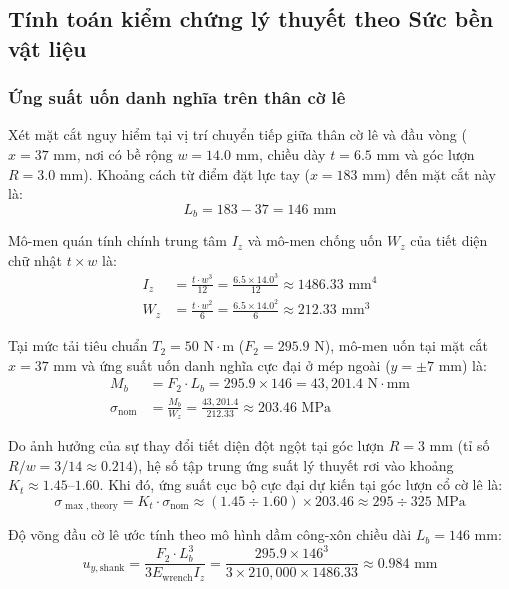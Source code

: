 \documentclass[12pt,a4paper]{article}
\begin{document}
\subsection{Tính toán kiểm chứng lý thuyết theo Sức bền vật liệu}

\subsubsection{Ứng suất uốn danh nghĩa trên thân cờ lê}
Xét mặt cắt nguy hiểm tại vị trí chuyển tiếp giữa thân cờ lê và đầu vòng ($x = 37\text{ mm}$, nơi có bề rộng $w = 14.0\text{ mm}$, chiều dày $t = 6.5\text{ mm}$ và góc lượn $R = 3.0\text{ mm}$). Khoảng cách từ điểm đặt lực tay ($x = 183\text{ mm}$) đến mặt cắt này là:
\begin{equation}
    L_b = 183 - 37 = 146\text{ mm}
\end{equation}

Mô-men quán tính chính trung tâm $I_z$ và mô-men chống uốn $W_z$ của tiết diện chữ nhật $t \times w$ là:
\begin{align}
    I_z &= \frac{t \cdot w^3}{12} = \frac{6.5 \times 14.0^3}{12} \approx 1486.33\text{ mm}^4 \\
    W_z &= \frac{t \cdot w^2}{6} = \frac{6.5 \times 14.0^2}{6} \approx 212.33\text{ mm}^3
\end{align}

Tại mức tải tiêu chuẩn $T_2 = 50\text{ N}\cdot\text{m}$ ($F_2 = 295.9\text{ N}$), mô-men uốn tại mặt cắt $x = 37\text{ mm}$ và ứng suất uốn danh nghĩa cực đại ở mép ngoài ($y = \pm 7\text{ mm}$) là:
\begin{align}
    M_b &= F_2 \cdot L_b = 295.9 \times 146 = 43,201.4\text{ N}\cdot\text{mm} \\
    \sigma_{\text{nom}} &= \frac{M_b}{W_z} = \frac{43,201.4}{212.33} \approx 203.46\text{ MPa}
\end{align}

Do ảnh hưởng của sự thay đổi tiết diện đột ngột tại góc lượn $R = 3\text{ mm}$ (tỉ số $R/w = 3/14 \approx 0.214$), hệ số tập trung ứng suất lý thuyết rơi vào khoảng $K_t \approx 1.45 \text{--} 1.60$. Khi đó, ứng suất cục bộ cực đại dự kiến tại góc lượn cổ cờ lê là:
\begin{equation}
    \sigma_{\max,\text{theory}} = K_t \cdot \sigma_{\text{nom}} \approx (1.45 \div 1.60) \times 203.46 \approx 295 \div 325\text{ MPa}
\end{equation}

Độ võng đầu cờ lê ước tính theo mô hình dầm công-xôn chiều dài $L_b = 146\text{ mm}$:
\begin{equation}
    u_{y,\text{shank}} = \frac{F_2 \cdot L_b^3}{3 E_{\text{wrench}} I_z} = \frac{295.9 \times 146^3}{3 \times 210,000 \times 1486.33} \approx 0.984\text{ mm}
\end{equation}
\end{document}
